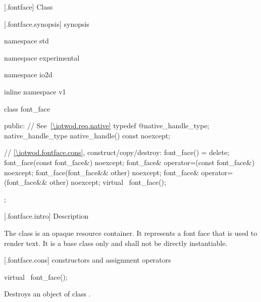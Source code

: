 [\iotwod.fontface] {Class }

 [\iotwod.fontface.synopsis] { synopsis}

\begin{codeblock}
namespace std { namespace experimental { namespace io2d { inline namespace v1 {
  class font_face {
  public:
    // See~\ref{\iotwod.req.native}
    typedef @\impdef@ native_handle_type;
    native_handle_type native_handle() const noexcept;

    // \ref{\iotwod.fontface.cons}, construct/copy/destroy:
    font_face() = delete;
    font_face(const font_face&) noexcept;
    font_face& operator=(const font_face&) noexcept;
    font_face(font_face&& other) noexcept;
    font_face& operator=(font_face&& other) noexcept;
    virtual ~font_face();
  };
} } } }
\end{codeblock}

 [\iotwod.fontface.intro] { Description}

\pnum
{}
The  class is an opaque resource container. It represents a 
font face that is used to render text. It is a base class only and shall not be
directly instantiable.

 [\iotwod.fontface.cons] { constructors and 
assignment operators}

\begin{itemdecl}
virtual ~font_face();
\end{itemdecl}
\begin{itemdescr}
	\pnum
	\effects
	Destroys an object of class .
	
\end{itemdescr}
